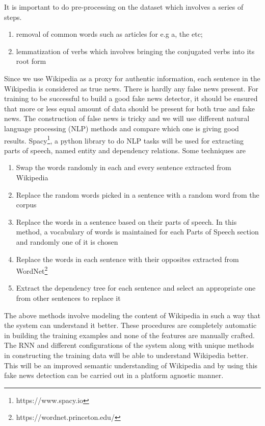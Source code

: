 \documentclass[a4paper, 11pt]{article}
\begin{document}
It is important to do pre-processing on the dataset which involves a series of steps.
\begin{enumerate}
\item removal of common words such as articles for e.g a, the etc; 
\item lemmatization of verbs which involves bringing the conjugated verbs into its root form 
\end{enumerate}

Since we use Wikipedia as a proxy for authentic information, each sentence in the Wikipedia is considered as true news. There is hardly any false news present. For training to be successful to build a good fake news detector, it should be ensured that more or less equal amount of data should be present for both true and fake news. The construction of false news is tricky and we will use different natural language processing (NLP) methods and compare which one is giving good results. Spacy\footnote{https://www.spacy.io}, a python library to do NLP tasks will be used for extracting parts of speech, named entity and dependency relations. Some techniques are 
\begin{enumerate}
\item Swap the words randomly in each and every sentence extracted from Wikipedia
\item Replace the random words picked in a sentence with a random word from the corpus
\item Replace the words in a sentence based on their parts of speech. In this method, a vocabulary of words is maintained for each Parts of Speech section and randomly one of it is chosen
\item Replace the words in each sentence with their opposites extracted from WordNet\footnote{https://wordnet.princeton.edu/}
\item Extract the dependency tree for each sentence and select an appropriate one from other sentences to replace it
\end{enumerate}


The above methods involve modeling the content of Wikipedia in such a way that the system can understand it better. These procedures are completely automatic in building the training examples and none of the features are manually crafted. The RNN and different configurations of the system along with unique methods in constructing the training data will be able to understand Wikipedia better. This will be an improved semantic understanding of Wikipedia and by using this fake news detection can be carried out in a platform agnostic manner. 
\end{document}
